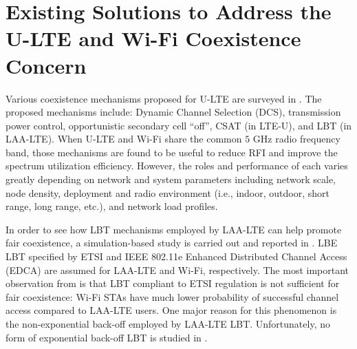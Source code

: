 \section{Existing Solutions to Address the U-LTE and Wi-Fi Coexistence Concern}

Various coexistence mechanisms proposed for \mbox{U-LTE} are surveyed in \cite{U-LTE-survey-2014, U-LTE-survey-2015, U-LTE-5G-2015}. The proposed mechanisms include: Dynamic Channel Selection (DCS), transmission power control, opportunistic secondary cell ``off'', CSAT (in \mbox{LTE-U}), and LBT (in \mbox{LAA-LTE}). When \mbox{U-LTE} and \mbox{Wi-Fi} share the common $5$ GHz radio frequency band, those mechanisms are found to be useful to reduce RFI and improve the spectrum utilization efficiency. However, the roles and performance of each varies greatly depending on network and system parameters including network scale, node density, deployment and radio environment (i.e., indoor, outdoor, short range, long range, etc.), and network load profiles. 

In order to see how LBT mechanisms employed by \mbox{LAA-LTE} can help promote fair coexistence, a simulation-based study is carried out and reported in \cite{LBT-CableLabs-2014}. LBE LBT specified by ETSI \cite{LBT-ETSI-2014} and IEEE 802.11e Enhanced Distributed Channel Access (EDCA) are assumed for \mbox{LAA-LTE} and \mbox{Wi-Fi}, respectively. The most important observation from \cite{LBT-CableLabs-2014} is that LBT compliant to ETSI regulation is not sufficient for fair coexistence: \mbox{Wi-Fi} STAs have much lower probability of successful channel access compared to \mbox{LAA-LTE} users. One major reason for this phenomenon is the non-exponential back-off employed by \mbox{LAA-LTE} LBT. Unfortunately, no form of exponential back-off LBT is studied in \cite{LBT-CableLabs-2014}.

